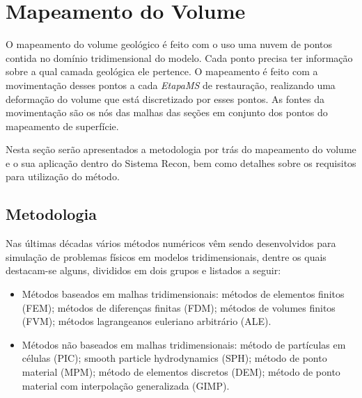 
\section{Mapeamento do Volume}

O mapeamento do volume geológico é feito com o uso uma nuvem de pontos contida no domínio tridimensional do modelo. Cada ponto precisa ter informação sobre a qual camada geológica ele pertence. O mapeamento é feito com a movimentação desses pontos a cada \textit{EtapaMS} de restauração, realizando uma deformação do volume que está discretizado por esses pontos. As fontes da movimentação são os nós das malhas das seções em conjunto dos pontos do mapeamento de superfície.

Nesta seção serão apresentados a metodologia por trás do mapeamento do volume e o sua aplicação dentro do Sistema Recon, bem como detalhes sobre os requisitos para utilização do método.

\subsection{Metodologia}\label{vol-metodology}

Nas últimas décadas vários métodos numéricos vêm sendo desenvolvidos para simulação de problemas físicos em modelos tridimensionais, dentre os quais destacam-se alguns, divididos em dois grupos e listados a seguir:

\renewcommand{\labelitemi}{•}
\begin{itemize}
  \item Métodos baseados em malhas tridimensionais: métodos de elementos finitos (FEM)\cite{MEF}; métodos de diferenças finitas (FDM)\cite{MDF}; métodos de volumes finitos (FVM)\cite{MVF}; métodos lagrangeanos euleriano arbitrário (ALE)\cite{ALE}.
  \item Métodos não baseados em malhas tridimensionais: método de partículas em células (PIC)\cite{PIC}; smooth particle hydrodynamics (SPH)\cite{SPH}; método de ponto material (MPM)\cite{MPM}; método de elementos discretos (DEM)\cite{DEM}; método de ponto material com interpolação generalizada (GIMP)\cite{GIMP,MullerGIMP}.
\end{itemize}

